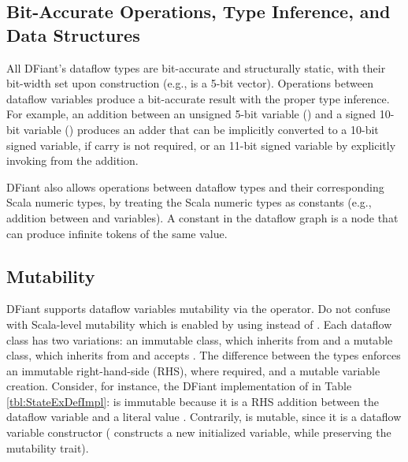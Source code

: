 

\subsection{Bit-Accurate Operations, Type Inference, and Data Structures}
All DFiant's dataflow types are bit-accurate and structurally static, with their bit-width set upon construction (e.g.,  is a 5-bit vector). Operations between dataflow variables produce a bit-accurate result with the proper type inference. For example, an addition between an unsigned 5-bit variable () and a signed 10-bit variable () produces an adder that can be implicitly converted to a 10-bit signed variable, if carry is not required, or an 11-bit signed variable by explicitly invoking  from the addition.

DFiant also allows operations between dataflow types and their corresponding Scala numeric types, by treating the Scala numeric types as constants (e.g., addition between  and  variables). A constant in the dataflow graph is a node that can produce infinite tokens of the same value.   

\subsection{Mutability}
\label{sec:mutability}
DFiant supports dataflow variables mutability via the \code{:=} operator. Do not confuse with Scala-level mutability which is enabled by using  instead of . Each dataflow class has two variations: an immutable class, which inherits from  and a mutable class, which inherits from  and accepts \code{:=}. The difference between the types enforces an immutable right-hand-side (RHS), where required, and a mutable variable creation. Consider, for instance, the DFiant implementation of  in Table \ref{tbl:StateExDefImpl}:  is immutable because it is a RHS addition between the dataflow variable  and a literal value . Contrarily,  is mutable, since it is a dataflow variable constructor ( constructs a new initialized variable, while preserving the mutability trait). 

